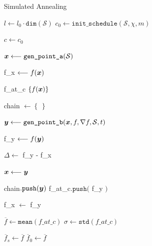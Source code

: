 \begin{algorithm}
\caption{Simulated Annealing}\label{algo:sa}
\vspace{8pt}
\nosemic
\SetAlgoLined
{}

$l \longleftarrow l_0 \cdot \texttt{dim}(\mathcal{S}) $ \;
$c_0 \longleftarrow \texttt{init\_schedule}(\mathcal{S}, \chi, m) $ \;

$c  \longleftarrow c_0$ \;

$\boldsymbol{x} \longleftarrow \texttt{gen\_point\_a}(\mathcal{S})$ \;

f\_x $\longleftarrow f(\boldsymbol{x})$ \;

{
    f\_at\_c \longleftarrow $\left\lbrace f(\boldsymbol{x}) \right\rbrace$ \;

    chain $\longleftarrow \left\lbrace \: \right\rbrace$ \;

     {

        $\boldsymbol{y} \longleftarrow \texttt{gen\_point\_b}(\boldsymbol{x}, f, \nabla f,\mathcal{S}, t )  $ \;

        f\_y $\longleftarrow f(\boldsymbol{y})$ \;

        $\Delta \longleftarrow $ f\_y - f\_x \;

        \If{ $\Delta \leq 0$ or $\exp\left( -\Delta /c ) > \texttt{random}[0,1) $ }
        {
            $\boldsymbol{x} \longleftarrow \boldsymbol{y} $ \;

            chain$.\texttt{push}(\boldsymbol{y})$ \;
            f\_at\_c$.\texttt{push}($ f\_y $)$\;

            f\_x $\longleftarrow$ f\_y \;


        }


    }

    $\overline{f} \longleftarrow \texttt{mean}(f\_at\_c)$ \;
    $\sigma \longleftarrow \texttt{std}(f\_at\_c)$ \;


     {
        $\overline{f}_s \longleftarrow \overline{f}$ \;
        $\overline{f}_0 \longleftarrow \overline{f}$ \;

    } 

}
\end{algorithm}
